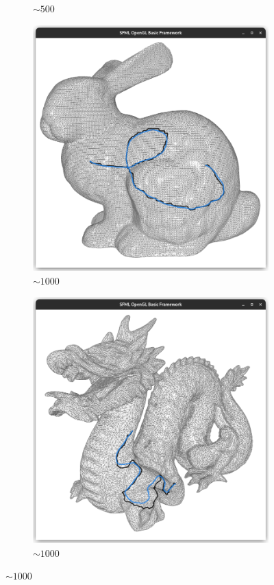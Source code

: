 \documentclass{stdlocal}
\begin{document}
\begin{figure}
\begin{subfigure}[b]{0.24\linewidth}
    \caption{$\sim 500$}
  \end{subfigure}
  \begin{subfigure}[b]{0.24\linewidth}
    \centering
    \includegraphics[width=\linewidth,trim={15px 20 15 50},clip]{images/bunny-smooth-1.png}
    \caption{$\sim 1000$}
  \end{subfigure}
  \begin{subfigure}[b]{0.24\linewidth}
    \centering
    \includegraphics[width=\linewidth,trim={15px 20 15 50},clip]{images/dragon-smooth-1.png}
    \caption{$\sim 1000$}
  \end{subfigure}


\end{figure}
\end{document}
